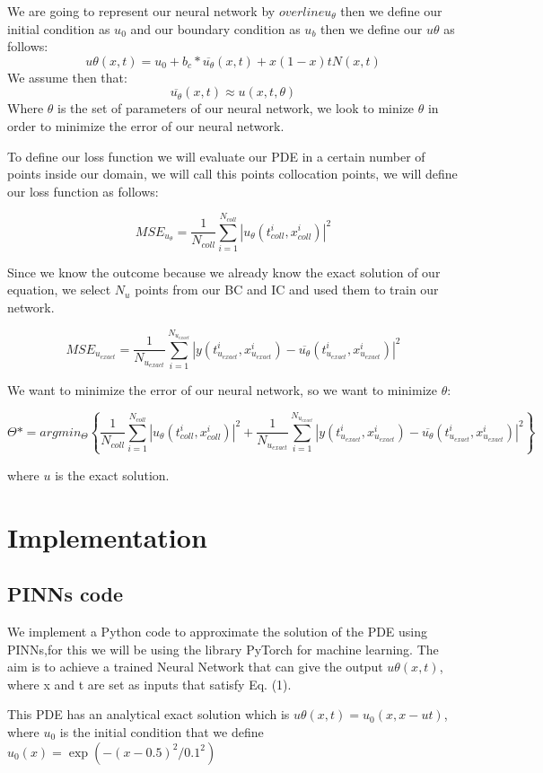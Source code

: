 \documentclass{article}
\begin{document}
We are going to represent our neural network by $overline{u_\theta}$ then we define our initial condition as $u_0$ and our boundary condition as $u_b$ then we define our $u\theta$ as follows:
$$
u\theta(x,t) = u_0 + b_c * \overline{u_\theta}(x,t) + x(1-x)tN(x,t)
$$
We assume then that:
$$\overline{u_\theta}(x,t)\approx u(x,t,\theta)$$ 
Where $\theta$ is the set of parameters of our neural network, we look to minize $\theta$ in order to minimize the error of our neural network.

To define our loss function we will evaluate our PDE in a certain number of points inside our domain, we will call this points collocation points, we will define our loss function as follows:

$$MSE_{u_\theta}=\frac{1}{N_{coll}}\sum^{N_{coll}}_{i=1}|u_\theta(t_{coll}^i,x_{coll}^i)|^2$$

Since we know the outcome because we already know the exact solution of our equation, we select $N_u$ points from our BC and IC and used them to train our network.

$$MSE_{u_{exact}}=\frac{1}{N_{u_{exact}}}\sum^{N_{u_{exact}}}_{i=1}|y(t_{u_{exact}}^i,x_{u_{exact}}^i)-\overline{u_\theta}(t_{u_{exact}}^i,x_{u_{exact}}^i)|^2$$

We want to minimize the error of our neural network, so we want to minimize $\theta$:

$$
\Theta* = argmin_\Theta \left\{ \frac{1}{N_{coll}}\sum^{N_{coll}}_{i=1}|u_\theta(t_{coll}^i,x_{coll}^i)|^2 + \frac{1}{N_{u_{exact}}}\sum^{N_{u_{exact}}}_{i=1}|y(t_{u_{exact}}^i,x_{u_{exact}}^i)-\overline{u_\theta}(t_{u_{exact}}^i,x_{u_{exact}}^i)|^2 \right\}
$$

where $u$ is the exact solution.

\section{Implementation}

\subsection{PINNs code}

We implement a Python code to approximate the solution of the PDE using PINNs,for this we will be using the library PyTorch for machine learning.
The aim is to achieve a trained Neural Network that can give the output $u\theta(x, t)$, where x and t are set as inputs that satisfy Eq. (1). 


This PDE has an analytical exact solution which is $u\theta(x,t) = u_0(x,x-ut)$, where $u_0$ is the initial condition that we define $u_0(x) = \exp(-(x-0.5)^2/0.1^2)$
\end{document}
